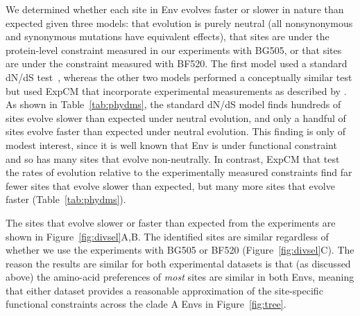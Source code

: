 \documentclass[9pt]{elife}
\begin{document}
\begin{figure}
\end{figure}

We determined whether each site in Env evolves faster or slower in nature than expected given three models: that evolution is purely neutral (all nonsynonymous and synonymous mutations have equivalent effects), that sites are under the protein-level constraint measured in our experiments with BG505, or that sites are under the constraint measured with BF520. 
The first model used a standard dN/dS test~\citep[the ``FEL'' method of][]{kosakovsky2005not}, whereas the other two models performed a conceptually similar test but used ExpCM that incorporate experimental measurements as described by \citet{bloom2017identification}.
As shown in Table~\ref{tab:phydms}, the standard dN/dS model finds hundreds of sites evolve slower than expected under neutral evolution, and only a handful of sites evolve faster than expected under neutral evolution.
This finding is only of modest interest, since it is well known that Env is under functional constraint and so has many sites that evolve non-neutrally.
In contrast, ExpCM that test the rates of evolution relative to the experimentally measured constraints find far fewer sites that evolve slower than expected, but many more sites that evolve faster (Table~\ref{tab:phydms}). 

The sites that evolve slower or faster than expected from the experiments are shown in Figure~\ref{fig:divsel}A,B.
The identified sites are similar regardless of whether we use the experiments with BG505 or BF520 (Figure~\ref{fig:divsel}C).
The reason the results are similar for both experimental datasets is that (as discussed above) the amino-acid preferences of \emph{most} sites are similar in both Envs, meaning that either dataset provides a reasonable approximation of the site-specific functional constraints across the clade A Envs in Figure~\ref{fig:tree}.
\end{document}
